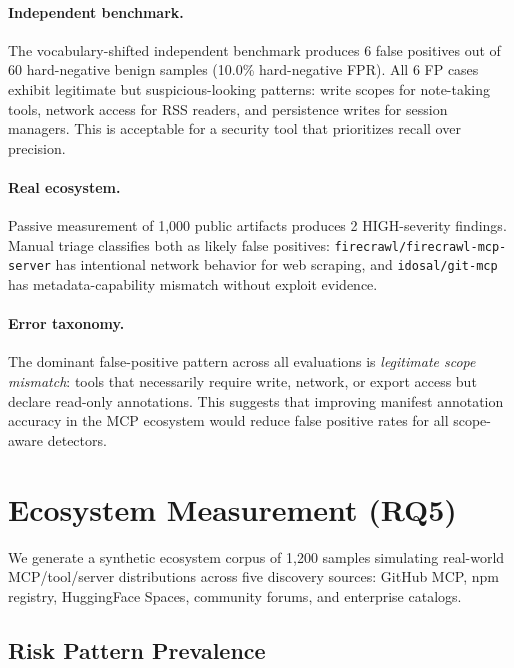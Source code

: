 \documentclass[10pt]{article}
\begin{document}
\paragraph{Independent benchmark.}
The vocabulary-shifted independent benchmark produces 6 false positives out of 60 hard-negative benign samples (10.0\% hard-negative FPR). All 6 FP cases exhibit legitimate but suspicious-looking patterns: write scopes for note-taking tools, network access for RSS readers, and persistence writes for session managers. This is acceptable for a security tool that prioritizes recall over precision.

\paragraph{Real ecosystem.}
Passive measurement of 1{,}000 public artifacts produces 2 HIGH-severity findings. Manual triage classifies both as likely false positives: \texttt{firecrawl/firecrawl-mcp-server} has intentional network behavior for web scraping, and \texttt{idosal/git-mcp} has metadata-capability mismatch without exploit evidence.

\paragraph{Error taxonomy.}
The dominant false-positive pattern across all evaluations is \textit{legitimate scope mismatch}: tools that necessarily require write, network, or export access but declare read-only annotations. This suggests that improving manifest annotation accuracy in the MCP ecosystem would reduce false positive rates for all scope-aware detectors.

\section{Ecosystem Measurement (RQ5)}
\label{sec:ecosystem}

We generate a synthetic ecosystem corpus of 1{,}200 samples simulating real-world MCP/tool/server distributions across five discovery sources: GitHub MCP, npm registry, HuggingFace Spaces, community forums, and enterprise catalogs.

\subsection{Risk Pattern Prevalence}
\end{document}
